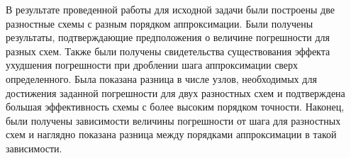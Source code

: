 \documentclass[12pt]{article}
\begin{document}
В результате проведенной работы для исходной задачи были построены две разностные схемы с разным порядком аппроксимации. Были получены результаты, подтверждающие предположения о величине погрешности для разных схем. Также были получены свидетельства существования эффекта ухудшения погрешности при дроблении шага аппроксимации сверх определенного. Была показана разница в числе узлов, необходимых для достижения заданной погрешности для двух разностных схем и подтверждена большая эффективность схемы с более высоким порядком точности. Наконец, были получены зависимости величины погрешности от шага для разностных схем и наглядно показана разница между порядками аппроксимации в такой зависимости.
\end{document}
